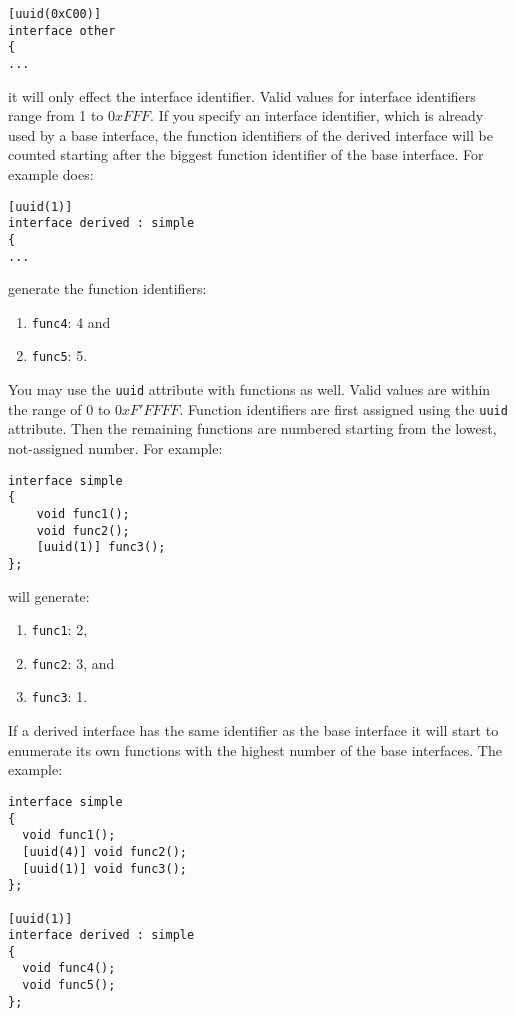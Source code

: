 \begin{verbatim}
[uuid(0xC00)]
interface other
{
...
\end{verbatim}

it will only effect the interface identifier. Valid values for interface 
identifiers range from 1 to $0xFFF$. If you specify an interface
identifier, which is already used by a base interface, the function
identifiers of the derived interface will be counted starting
after the biggest function identifier of the base interface. For example does:

\begin{verbatim}
[uuid(1)]
interface derived : simple
{
...
\end{verbatim}

generate the function identifiers:

\begin{enumerate}
\item \verb|func4|: 4 and
\item \verb|func5|: 5.
\end{enumerate}

You may use the \verb|uuid| attribute with functions as
well. Valid values are within the range of $0$ to $0xF'FFFF$. 
Function identifiers are first assigned
using the \verb|uuid| attribute. Then the remaining functions are
numbered starting from the lowest, not-assigned number. For example:

\begin{verbatim}
interface simple
{
    void func1();
    void func2();
    [uuid(1)] func3();
};
\end{verbatim}

will generate:

\begin{enumerate}
\item \verb|func1|: 2,
\item \verb|func2|: 3, and
\item \verb|func3|: 1.
\end{enumerate}

If a derived interface has the same identifier as the base interface
it will start to enumerate its own functions with the highest number
of the base interfaces. The example:

\begin{verbatim}
interface simple
{
  void func1();
  [uuid(4)] void func2();
  [uuid(1)] void func3();
};

[uuid(1)]
interface derived : simple
{
  void func4();
  void func5();
};
\end{verbatim}

